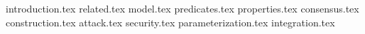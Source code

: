 {introduction.tex}
{related.tex}
{model.tex}
{predicates.tex}
{properties.tex}
{consensus.tex}
{construction.tex}
{attack.tex}
{security.tex}
{parameterization.tex}
{integration.tex}

